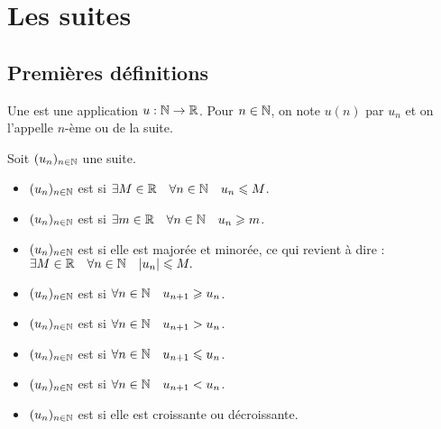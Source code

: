 \documentclass[10pt,class=article,crop=false]{standalone}
\begin{document}
	
	
\section{Les suites}

\begin{multicols}{2}
	

\subsection{Premières définitions}

Une  est une application $u:\mathbb{N}\to \mathbb{R}$.
Pour $n\in \mathbb{N}$, on note $u(n)$ par $u_n$ et on l'appelle $n$-ème{}  ou  de la suite.

Soit $(u_n)_{n\in \mathbb{N}}$ une suite.
	\begin{itemize}
		\item $(u_n)_{n\in \mathbb{N}}$ est  si \quad $\exists M \in \mathbb{R} \quad \forall n\in \mathbb{N} \quad u_n \leqslant M$.
		\item $(u_n)_{n\in \mathbb{N}}$ est  si \quad $\exists m \in \mathbb{R} \quad  \forall n\in \mathbb{N} \quad u_n \geqslant m$.
		\item $(u_n)_{n\in \mathbb{N}}$ est  si elle est majorée et minorée, ce qui revient à dire :
		\quad $\exists M \in \mathbb{R} \quad  \forall n\in \mathbb{N} \quad |u_n| \leqslant M.$
	\end{itemize}

	\begin{itemize}
		\item $(u_n)_{n\in \mathbb{N}}$ est  si \quad $\forall n\in \mathbb{N} \quad u_{n+1} \geqslant u_n $.
		\item $(u_n)_{n\in \mathbb{N}}$ est  si \quad $\forall n\in \mathbb{N} \quad u_{n+1} > u_n$.
		\item $(u_n)_{n\in \mathbb{N}}$ est  si \quad $\forall n\in \mathbb{N} \quad u_{n+1} \leqslant u_n$.
		\item $(u_n)_{n\in \mathbb{N}}$ est  si \quad $\forall n\in \mathbb{N} \quad u_{n+1} < u_n$.
		\item $(u_n)_{n\in \mathbb{N}}$ est  si elle est croissante ou décroissante.
	\end{itemize}




\end{multicols}
\end{document}
